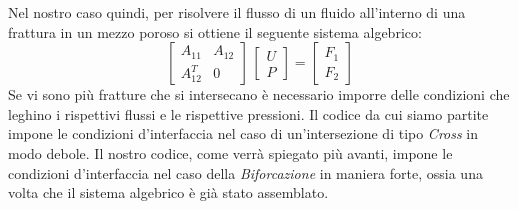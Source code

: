 Nel nostro caso quindi, per risolvere il flusso di un fluido all'interno di una frattura in un mezzo poroso si ottiene il seguente sistema algebrico:
\begin{equation}
\left[\begin{matrix}A_{11} &A_{12} \\A_{12}^T & 0 \end{matrix}\right] \, \left[\begin{matrix}U  \\P \end{matrix}\right] = \left[\begin{matrix}F_{1} \\F_{2} \end{matrix}\right] 
\end{equation}
Se vi sono più fratture che si intersecano è necessario imporre delle condizioni che leghino i rispettivi flussi e le rispettive pressioni. Il codice da cui siamo partite impone le condizioni d'interfaccia nel caso di un'intersezione di tipo \textit{Cross} in modo debole. Il nostro codice, come verrà spiegato più avanti, impone le condizioni d'interfaccia nel caso della \textit{Biforcazione} in maniera forte, ossia una volta che il sistema algebrico è già stato assemblato.